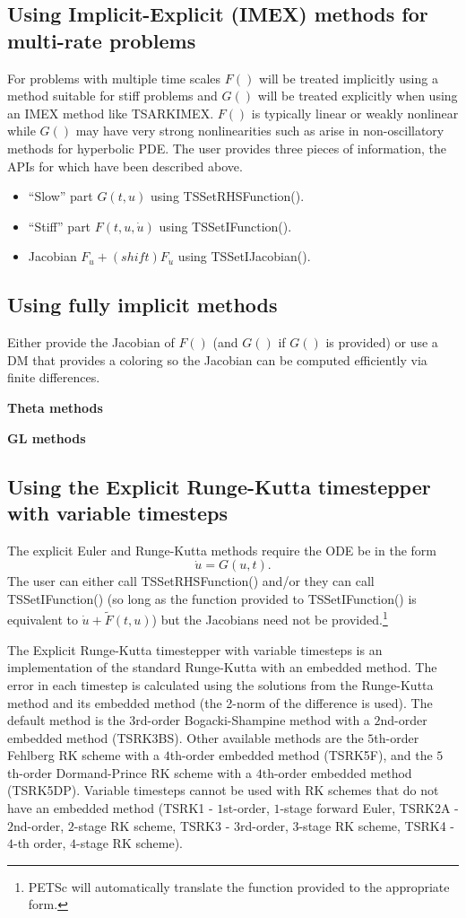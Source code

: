 \subsection{Using Implicit-Explicit (IMEX) methods for multi-rate problems}
\label{sec_imex}
For problems with multiple time scales
$F()$ will be treated implicitly using a method suitable for stiff problems and $G()$ will be treated explicitly when using an IMEX method like TSARKIMEX.
$F()$ is typically linear or weakly nonlinear while $G()$ may have very strong nonlinearities such as arise in non-oscillatory methods for hyperbolic PDE.
The user provides three pieces of information, the APIs for which have been described above.
\begin{itemize}
\item ``Slow'' part $G(t,u)$ using TSSetRHSFunction().
\item ``Stiff'' part $F(t,u,\dot u)$ using TSSetIFunction().
\item Jacobian $F_u + (shift) F_{\dot u}$ using TSSetIJacobian().
\end{itemize}

\subsection{Using fully implicit methods}
Either provide the Jacobian of $F() $ (and $G()$ if $G()$ is provided) or use a DM that provides a coloring so the Jacobian can be computed efficiently via finite differences.

{\bf Theta methods}

{\bf GL methods}

\subsection{Using the Explicit Runge-Kutta timestepper with variable timesteps}
The explicit Euler and Runge-Kutta methods require the ODE be in the form
\[
    \dot{u} = G(u,t).
\]
The user can either call TSSetRHSFunction() and/or they can call TSSetIFunction() (so long as the function provided to TSSetIFunction() is equivalent to
$ \dot{u} + \tilde{F}(t,u) $) but
the Jacobians need not be provided.\footnote{PETSc will automatically translate the function provided to the appropriate form.}

The Explicit Runge-Kutta timestepper with variable timesteps is an 
implementation of the standard Runge-Kutta with an embedded method. The error in each
timestep is calculated using the solutions from the Runge-Kutta method and its embedded
method (the 2-norm of the difference is used). The default method is the 
$3$rd-order Bogacki-Shampine method with a $2$nd-order embedded method (TSRK3BS).
Other available methods are the  $5$th-order Fehlberg RK scheme with a $4$th-order embedded
method (TSRK5F), and the  $5$th-order Dormand-Prince RK scheme with a $4$th-order embedded method
(TSRK5DP). Variable timesteps cannot be used with RK schemes that do not have an embedded
method (TSRK1 - $1$st-order, $1$-stage forward Euler, TSRK2A - $2$nd-order, $2$-stage RK scheme,
TSRK3 - $3$rd-order, $3$-stage RK scheme, TSRK4 - $4$-th order, $4$-stage RK scheme).

